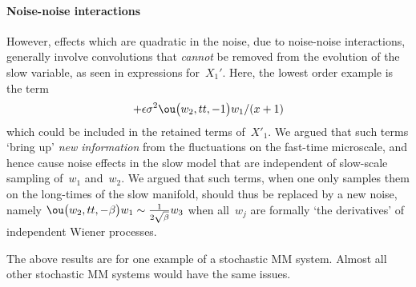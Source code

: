 \begin{itemize}
\paragraph{Noise-noise interactions}
However, effects which are quadratic in the noise, due to
noise-noise interactions, generally involve convolutions
that \emph{cannot} be removed from the evolution of the slow
variable, as seen in expressions for~\(X_1'\). Here, the
lowest order example is the term
\begin{equation*}
+\epsilon  \sigma ^{2} \ou\big(w_{2},tt,-1\big) w_{1} /(x+1)
\end{equation*}
which could be included in the retained terms of~\(X'_1\).
We argued \cite[\S4]{Chao95} that such terms `bring up'
\emph{new information} from the fluctuations on the
fast-time microscale, and hence cause noise effects in the
slow model that are independent of slow-scale sampling
of~\(w_1\) and~\(w_2\). We argued that such terms, when one
only samples them on the long-times of the slow manifold,
should thus be replaced by a new noise, namely
\(\ou\big(w_{2},tt,-\beta\big)
w_{1}\sim\frac1{2\sqrt\beta}w_3\) when all~\(w_j\) are
formally `the derivatives' of independent Wiener processes.

\end{itemize}

The above results are for one example of a stochastic MM
system.  Almost all other stochastic MM systems would have
the same issues.



